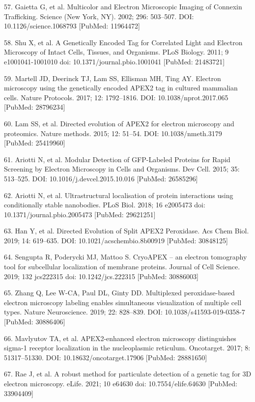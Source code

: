 \documentclass{article}
\begin{document}
\begin{hangpars}
57. Gaietta G, et al. Multicolor and Electron Microscopic Imaging of Connexin Trafficking. Science (New York, NY). 2002; 296: 503–507. DOI: 10.1126/science.1068793 [PubMed: 11964472]

58. Shu X, et al. A Genetically Encoded Tag for Correlated Light and Electron Microscopy of Intact Cells, Tissues, and Organisms. PLoS Biology. 2011; 9 e1001041-1001010 doi: 10.1371/journal.pbio.1001041 [PubMed: 21483721]

59. Martell JD, Deerinck TJ, Lam SS, Ellisman MH, Ting AY. Electron microscopy using the genetically encoded APEX2 tag in cultured mammalian cells. Nature Protocols. 2017; 12: 1792–1816. DOI: 10.1038/nprot.2017.065 [PubMed: 28796234]

60. Lam SS, et al. Directed evolution of APEX2 for electron microscopy and proteomics. Nature methods. 2015; 12: 51–54. DOI: 10.1038/nmeth.3179 [PubMed: 25419960]

61. Ariotti N, et al. Modular Detection of GFP-Labeled Proteins for Rapid Screening by Electron Microscopy in Cells and Organisms. Dev Cell. 2015; 35: 513–525. DOI: 10.1016/j.devcel.2015.10.016 [PubMed: 26585296]

62. Ariotti N, et al. Ultrastructural localisation of protein interactions using conditionally stable nanobodies. PLoS Biol. 2018; 16 e2005473 doi: 10.1371/journal.pbio.2005473 [PubMed: 29621251]

63. Han Y, et al. Directed Evolution of Split APEX2 Peroxidase. Acs Chem Biol. 2019; 14: 619–635. DOI: 10.1021/acschembio.8b00919 [PubMed: 30848125]

64. Sengupta R, Poderycki MJ, Mattoo S. CryoAPEX – an electron tomography tool for subcellular localization of membrane proteins. Journal of Cell Science. 2019; 132 jcs222315 doi: 10.1242/jcs.222315 [PubMed: 30886003]

65. Zhang Q, Lee W-CA, Paul DL, Ginty DD. Multiplexed peroxidase-based electron microscopy labeling enables simultaneous visualization of multiple cell types. Nature Neuroscience. 2019; 22: 828–839. DOI: 10.1038/s41593-019-0358-7 [PubMed: 30886406]

66. Mavlyutov TA, et al. APEX2-enhanced electron microscopy distinguishes sigma-1 receptor localization in the nucleoplasmic reticulum. Oncotarget. 2017; 8: 51317–51330. DOI: 10.18632/oncotarget.17906 [PubMed: 28881650]

67. Rae J, et al. A robust method for particulate detection of a genetic tag for 3D electron microscopy. eLife. 2021; 10 e64630 doi: 10.7554/elife.64630 [PubMed: 33904409]


\end{hangpars}
\end{document}

